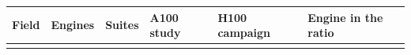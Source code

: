 \begin{longtable}{llllll}
\toprule
Field & Engines & Suites & A100 study & H100 campaign & Engine in the ratio \\
\midrule
\endhead
\bottomrule
\endfoot
\end{longtable}
